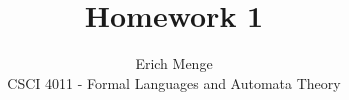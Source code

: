 \documentclass[12pt]{article}
\begin{document}

\title{Homework 1}%
\author{Erich Menge\\ %
CSCI 4011 - Formal Languages and Automata Theory} %

\maketitle

 \newpage
 \newpage
 \newpage
 \newpage
 \newpage
 \newpage
 \newpage
 \newpage

\end{document}
